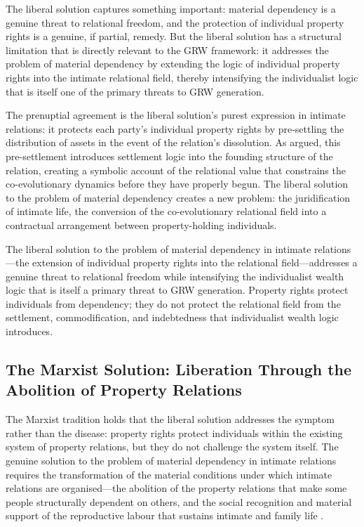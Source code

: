 The liberal solution captures something important: material dependency is a genuine threat to relational freedom, and the protection of individual property rights is a genuine, if partial, remedy. But the liberal solution has a structural limitation that is directly relevant to the GRW framework: it addresses the problem of material dependency by extending the logic of individual property rights into the intimate relational field, thereby intensifying the individualist logic that is itself one of the primary threats to GRW generation.

The prenuptial agreement is the liberal solution's purest expression in intimate relations: it protects each party's individual property rights by pre-settling the distribution of assets in the event of the relation's dissolution. As  argued, this pre-settlement introduces settlement logic into the founding structure of the relation, creating a symbolic account of the relational value that constrains the co-evolutionary dynamics before they have properly begun. The liberal solution to the problem of material dependency creates a new problem: the juridification of intimate life, the conversion of the co-evolutionary relational field into a contractual arrangement between property-holding individuals.

\begin{claim}
The liberal solution to the problem of material dependency in intimate relations---the extension of individual property rights into the relational field---addresses a genuine threat to relational freedom while intensifying the individualist wealth logic that is itself a primary threat to GRW generation. Property rights protect individuals from dependency; they do not protect the relational field from the settlement, commodification, and indebtedness that individualist wealth logic introduces.
\end{claim}

\subsection{The Marxist Solution: Liberation Through the Abolition of Property Relations}
\label{p15:subsec:marxist_solution}

\noindent
The Marxist tradition holds that the liberal solution addresses the symptom rather than the disease: property rights protect individuals within the existing system of property relations, but they do not challenge the system itself. The genuine solution to the problem of material dependency in intimate relations requires the transformation of the material conditions under which intimate relations are organised---the abolition of the property relations that make some people structurally dependent on others, and the social recognition and material support of the reproductive labour that sustains intimate and family life \parencite{federici2004}.

